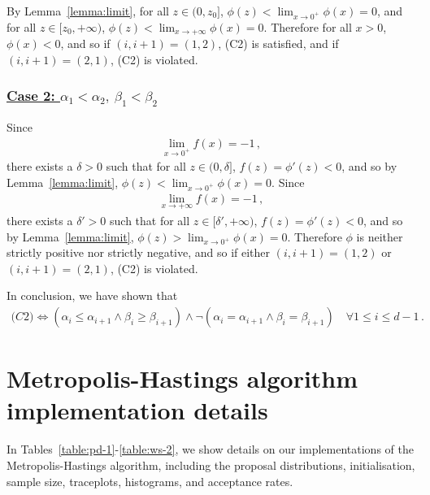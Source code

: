 \documentclass{article}
\newcommand{\metroall}[3]{
	\begin{table}
		\centering
		\renewcommand{\arraystretch}{1.2}
		
		\caption{Metropolis-Hastings algorithm for
			$\pi_{\theta}^{\text{G3}}$ for #3}
		\label{table:#1-1}
	\end{table}
	
	\begin{table}
		\centering
		\renewcommand{\arraystretch}{1.2}
		
		\caption{Metropolis algorithm for
			$\pi^{\text{G3}}_{\theta \mid \mathbf{x}^{\text{#2}}}$ for #3}
	\end{table}
	
	\begin{table}
		\centering
		\renewcommand{\arraystretch}{1.2}
		
		\caption{Metropolis-Hastings algorithm for
			$\pi^{\text{G2}}_{\theta \mid \mathbf{x}^{\text{#2}}}$ for #3}
	\end{table}
	
	\begin{table}
		\centering
		\renewcommand{\arraystretch}{1.2}
		
		\caption{Metropolis-Hastings algorithm for
			$\pi^{\text{G1}}_{\theta \mid \mathbf{x}^{\text{#2}}}$ for #3}
	\end{table}
	
	\begin{table}
		\centering
		\renewcommand{\arraystretch}{1.2}
		
		\caption{Metropolis-Hastings algorithm for
			$\pi_{\theta}^{\text{MEC}}$ for #3}
	\end{table}
	
	\begin{table}
		\centering
		\renewcommand{\arraystretch}{1.2}
		
		\caption{Metropolis-Hastings algorithm for
			$\pi^{\text{MEC}}_{\theta \mid \mathbf{x}^{\text{#2}}}$ for #3}
	\end{table}

	\begin{table}
		\centering
		\renewcommand{\arraystretch}{1.2}
		
		\caption{Metropolis-Hastings algorithm for
			$\pi_{\theta}^{\text{E}}$ for #3}
	\end{table}
	
	\begin{table}
		\centering
		\renewcommand{\arraystretch}{1.2}
		
		\caption{Metropolis-Hastings algorithm for
			$\pi^{\text{E}}_{\theta \mid \mathbf{x}^{\text{#2}}}$ for #3}
	\end{table}

	\begin{table}
		\centering
		\renewcommand{\arraystretch}{1.2}
		
		\caption{Metropolis-Hastings algorithm for
			$\pi_{\theta}^{\text{TN}}$ for #3}
	\end{table}
	
	\begin{table}
		\centering
		\renewcommand{\arraystretch}{1.2}
		
		\caption{Metropolis-Hastings algorithm for
			$\pi^{\text{TN}}_{\theta \mid \mathbf{x}^{\text{#2}}}$ for #3}
		\label{table:#1-2}
	\end{table}
}
\begin{document}
%
By Lemma~\ref{lemma:limit}, for all $z \in (0, z_0]$,
$\phi(z) < \lim_{x\to 0^+}\phi(x)=0$, and for all $z \in[z_0, +\infty)$,
$\phi(z) < \lim_{x \to +\infty} \phi(x) = 0$.
Therefore for all $x > 0$, $\phi(x) < 0$, and so if $(i, i + 1)=(1, 2)$,
(C2) is satisfied, and if $(i, i + 1) = (2, 1)$, (C2) is violated.
%
\subsubsection*{\underline{Case 2: $\alpha_1 < \alpha_2, \  \beta_1 < \beta_2$}}
%

%
Since
%
\begin{align*}
	\lim_{x \to 0^+} f(x) = -1 \,,
\end{align*}
%
there exists a $\delta > 0$ such that for all $z \in (0, \delta]$,
$f(z) = \phi'(z) < 0$, and so by Lemma~\ref{lemma:limit},
$\phi(z) < \lim_{x \to 0^+} \phi(x) = 0$. Since
%
\begin{align*}
	\lim_{x \to +\infty} f(x) = -1 \,,
\end{align*}
%
there exists a $\delta' > 0$ such that for all $z \in [\delta', +\infty)$,
$f(z) = \phi'(z) < 0$, and so by Lemma~\ref{lemma:limit},
$\phi(z) > \lim_{x \to 0^+} \phi(x) = 0$.
Therefore $\phi$ is neither strictly positive nor strictly negative,
and so if either $(i, i + 1) = (1, 2)$ or
$(i, i + 1) = (2, 1)$, (C2) is violated.
%

%
In conclusion, we have shown that
%
\begin{align*}
	\textit{(C2)} \iff (\alpha_i \leq \alpha_{i + 1} \land \beta_{i}
	\geq \beta_{i + 1}) \land \neg(\alpha_i = \alpha_{i+1} \land \beta_i
	= \beta_{i + 1}) \quad \forall 1 \leq i\leq d - 1 \,.
\end{align*}
%
%
\section{Metropolis-Hastings algorithm implementation details}
\label{section:mcmc-tables}
%

%
In Tables~\ref{table:pd-1}-\ref{table:ws-2}, we show details on our
implementations of the Metropolis-Hastings algorithm, including
the proposal distributions, initialisation, sample size, traceplots,
histograms, and acceptance rates.
%
\metroall{ppp}{PPP}{Poisson process simulation study}
\metroall{pd}{PD}{pseudo-data simulation study}
\metroall{ws}{WS}{wind speed data}
%
\FloatBarrier
%
\end{document}
